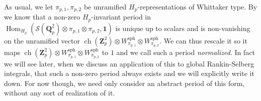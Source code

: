 \documentclass{amsart}%
\theoremstyle{plain}
\theoremstyle{plain}
\theoremstyle{remark}
\DeclareMathOperator{\ch}{ch}
\DeclareMathOperator{\Hom}{Hom}
\begin{document}
As usual, we let $\pi_{p,1},\pi_{p,2}$ be unramified $H_p$-representations of Whittaker type. By  we know that a non-zero $H_p$-invariant period in $\Hom_{H_p}(\mathcal{S}(\mathbf{Q}_p^2)\otimes \pi_{p,1}\otimes \pi_{p,2},\mathbf{1})$ is unique up to scalars and is non-vanishing on the unramified vector $\ch(\mathbf{Z}_p^2)\otimes W_{\pi_{p,1}}^\mathrm{sph}\otimes W_{\pi_{p,2}}^\mathrm{sph}$. We can thus rescale it so it maps $\ch(\mathbf{Z}_p^2)\otimes W_{\pi_{p,1}}^\mathrm{sph}\otimes W_{\pi_{p,2}}^\mathrm{sph}$ to $1$ and we call such a period \textit{normalized}. In fact we will see later, when we discuss an application of this to global Rankin-Selberg integrals, that such a non-zero period always exists and we will explicitly write it down. For now though, we need only consider an abstract period of this form, without any sort of realization of it. 
\end{document}

